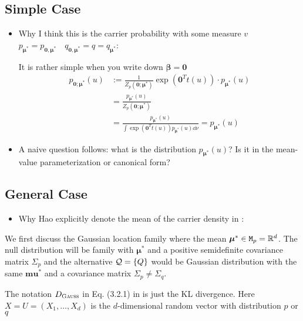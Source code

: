 \subsection{Simple Case}
\begin{itemize}
	\item Why I think this is the carrier probability with some measure $v$ $p_{\bm{\mu}^*} = p_{\bm{0}, \bm{\mu}^*} \quad q_{\bm{0},\bm{\mu}^*} = q = q_{\bm{\mu}^*}$:

	      It is rather simple when you write down $\bm{\beta}=\bm{0}$
	      \begin{align*}
		      p_{\bm{0};\bm{\mu}^*}(u) & :=
		      \frac{1}{Z_p(\bm{0};\bm{\mu}^*)}\exp(\bm{0}^T t(u))\cdot p_{\bm{\mu}^*}(u)                               \\
		                               & = \frac{p_{\bm{\mu}^*}(u)}{Z_p(\bm{0};\bm{\mu}^*)}                            \\
		                               & = \frac{p_{\bm{\mu}^*}(u)}{\int\exp(\bm{0}^T t(u)) p_{\bm{\mu}^*}(u)\dd{\nu}}
		      = p_{\bm{\mu}^*}(u)
	      \end{align*}

	\item A naive question follows: what is the distribution $p_{\bm{\mu}^*}(u)$?
	      Is it in the mean-value parameterization or canonical form?
\end{itemize}

\subsection{General Case}

\begin{itemize}
	\item Why Hao explicitly denote the mean of the carrier density in \cite{grunwaldSafeTesting2024}:
\end{itemize}

We first discuss the Gaussian location family where the mean $\bm{\mu}^*\in\mathtt{M}_p=\mathbb{R}^d$.
The null distribution will be family with $\bm{\mu}^*$ and a positive semidefinite covariance matrix $\Sigma_p$
and the alternative $\mathcal{Q}=\{Q\}$ would be Gaussian distribution with the same $\bm{mu}^*$ and
a covariance matrix $\Sigma_p \not= \Sigma_q$.

The notation $D_{\textsc{Gauss}}$ in Eq. (3.2.1) in \cite{haoEvaluesAnytimevalidInference2025} is
just the KL divergence. Here $X=U=(X_1,\dots,X_d)$ is the $d$-dimensional random vector with
distribution $p$ or $q$

